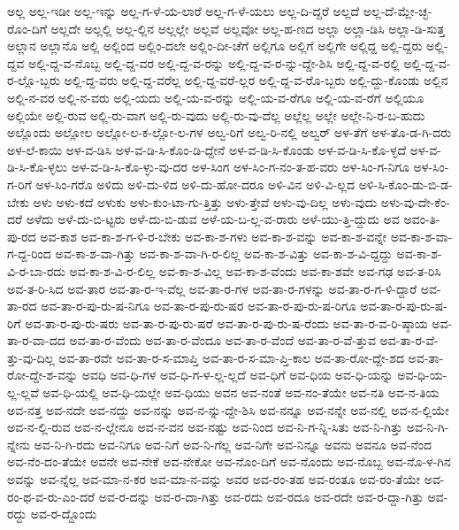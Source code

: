 {ಅಲ್ಲ
ಅಲ್ಲ-ಇಡೀ
ಅಲ್ಲ-ಇನ್ನು
ಅಲ್ಲ-ಗ-ಳೆ-ಯ-ಲಾರೆ
ಅಲ್ಲ-ಗ-ಳೆ-ಯಲು
ಅಲ್ಲ-ದಿ-ದ್ದರೆ
ಅಲ್ಲದೆ
ಅಲ್ಲ-ದೆ-ಮ್ಲೇ-ಚ್ಛ-ರೊಂ-ದಿಗೆ
ಅಲ್ಲದೇ
ಅಲ್ಲಲ್ಲಿ
ಅಲ್ಲ-ಲ್ಲಿನ
ಅಲ್ಲಲ್ಲೇ
ಅಲ್ಲವೆ
ಅಲ್ಲವೋ
ಅಲ್ಲ-ಹ-ಣದ
ಅಲ್ಲಾ
ಅಲ್ಲಾ-ಡಿಸಿ
ಅಲ್ಲಾ-ಡಿ-ಸುತ್ತ
ಅಲ್ಲಾನ
ಅಲ್ಲಾನೊ
ಅಲ್ಲಿ
ಅಲ್ಲಿಂದ
ಅಲ್ಲಿಂ-ದಲೇ
ಅಲ್ಲಿಂ-ದೀ-ಚೆಗೆ
ಅಲ್ಲಿಗೂ
ಅಲ್ಲಿಗೆ
ಅಲ್ಲಿಗೇ
ಅಲ್ಲಿದ್ದ
ಅಲ್ಲಿ-ದ್ದರು
ಅಲ್ಲಿ-ದ್ದವ
ಅಲ್ಲಿ-ದ್ದ-ವ-ನೊಬ್ಬ
ಅಲ್ಲಿ-ದ್ದ-ವರ
ಅಲ್ಲಿ-ದ್ದ-ವ-ರನ್ನು
ಅಲ್ಲಿ-ದ್ದ-ವ-ರ-ನ್ನು-ದ್ದೇ-ಶಿಸಿ
ಅಲ್ಲಿ-ದ್ದ-ವ-ರಲ್ಲಿ
ಅಲ್ಲಿ-ದ್ದ-ವ-ರ-ಲ್ಲೊ-ಬ್ಬರು
ಅಲ್ಲಿ-ದ್ದ-ವರು
ಅಲ್ಲಿ-ದ್ದ-ವರೆಲ್ಲ
ಅಲ್ಲಿ-ದ್ದ-ವರೆ-ಲ್ಲರ
ಅಲ್ಲಿ-ದ್ದ-ವ-ರೊ-ಬ್ಬರು
ಅಲ್ಲಿ-ದ್ದು-ಕೊಂಡು
ಅಲ್ಲಿನ
ಅಲ್ಲಿ-ನ-ವರ
ಅಲ್ಲಿ-ನ-ವರು
ಅಲ್ಲಿ-ಯದು
ಅಲ್ಲಿ-ಯ-ವ-ರನ್ನು
ಅಲ್ಲಿ-ಯ-ವ-ರೆಗೂ
ಅಲ್ಲಿ-ಯ-ವ-ರೆಗೆ
ಅಲ್ಲಿಯೂ
ಅಲ್ಲಿಯೇ
ಅಲ್ಲಿ-ರುವ
ಅಲ್ಲಿ-ರು-ವಾಗ
ಅಲ್ಲಿ-ರು-ವುದು
ಅಲ್ಲಿ-ರು-ವು-ದೆಲ್ಲ
ಅಲ್ಲೆಲ್ಲ
ಅಲ್ಲೇ
ಅಲ್ಲೇ-ನಿ-ರ-ಬ-ಹುದು
ಅಲ್ಲೊಂದು
ಅಲ್ಲೋಲ
ಅಲ್ಲೋ-ಲ-ಕ-ಲ್ಲೋ-ಲ-ಗಳ
ಅಲ್ವ-ರಿಗೆ
ಅಲ್ವ-ರಿ-ನಲ್ಲಿ
ಅಲ್ವರ್
ಅಳ-ತೆಗೆ
ಅಳ-ತೊ-ಡ-ಗಿ-ದರು
ಅಳ-ಲೆ-ಕಾಯಿ
ಅಳ-ವ-ಡಿಸಿ
ಅಳ-ವ-ಡಿ-ಸಿ-ಕೊಂ-ಡಿ-ದ್ದೇನೆ
ಅಳ-ವ-ಡಿ-ಸಿ-ಕೊಂಡು
ಅಳ-ವ-ಡಿ-ಸಿ-ಕೊ-ಳ್ಳದೆ
ಅಳ-ವ-ಡಿ-ಸಿ-ಕೊ-ಳ್ಳಲು
ಅಳ-ವ-ಡಿ-ಸಿ-ಕೊ-ಳ್ಳು-ವು-ದರ
ಅಳ-ಸಿಂಗ
ಅಳ-ಸಿಂ-ಗ-ನಂ-ತ-ಹ-ವರು
ಅಳ-ಸಿಂ-ಗ-ನಿಗೂ
ಅಳ-ಸಿಂ-ಗ-ರಿಗೆ
ಅಳ-ಸಿಂ-ಗರೊ
ಅಳಿದು
ಅಳಿ-ದು-ಳಿದ
ಅಳಿ-ದು-ಹೋ-ದರೂ
ಅಳಿ-ವಿನ
ಅಳಿ-ವಿ-ಲ್ಲದ
ಅಳಿ-ಸಿ-ಕೊಂ-ಡು-ಬಿ-ಡ-ಬೇಕು
ಅಳು
ಅಳು-ಕದೆ
ಅಳುಕು
ಅಳು-ಕುಂ-ಟಾ-ಗು-ತ್ತಿತ್ತು
ಅಳು-ತ್ತೇವೆ
ಅಳು-ವು-ದಿಲ್ಲ
ಅಳು-ವುದು
ಅಳು-ವು-ದೇ-ಕೆಂ-ದರೆ
ಅಳೆದು
ಅಳೆ-ದು-ಬಿ-ಟ್ಟರು
ಅಳೆ-ದು-ಬಿ-ಡುವ
ಅಳೆ-ಯ-ಬ-ಲ್ಲ-ವ-ರಾರು
ಅಳೆ-ಯು-ತ್ತಿ-ದ್ದುದು
ಅವ
ಅವಂ-ತಿ-ಪು-ರದ
ಅವ-ಕಾಶ
ಅವ-ಕಾ-ಶ-ಗ-ಳಿ-ರ-ಬೇಕು
ಅವ-ಕಾ-ಶ-ಗಳು
ಅವ-ಕಾ-ಶ-ವನ್ನು
ಅವ-ಕಾ-ಶ-ವನ್ನೇ
ಅವ-ಕಾ-ಶ-ವಾ-ಗ-ದ್ದ-ರಿಂದ
ಅವ-ಕಾ-ಶ-ವಾ-ಗಿತ್ತು
ಅವ-ಕಾ-ಶ-ವಾ-ಗಿ-ರ-ಲಿಲ್ಲ
ಅವ-ಕಾ-ಶ-ವಿತ್ತು
ಅವ-ಕಾ-ಶ-ವಿ-ದ್ದದ್ದು
ಅವ-ಕಾ-ಶ-ವಿ-ರ-ಬಾ-ರದು
ಅವ-ಕಾ-ಶ-ವಿ-ರ-ಲಿಲ್ಲ
ಅವ-ಕಾ-ಶ-ವಿಲ್ಲ
ಅವ-ಕಾ-ಶ-ವೆಂದು
ಅವ-ಕಾ-ಶವೇ
ಅವ-ಗಢ
ಅವ-ತ-ರಿಸಿ
ಅವ-ತ-ರಿ-ಸಿದ
ಅವ-ತಾರ
ಅವ-ತಾ-ರ-ಇ-ವೆಲ್ಲ
ಅವ-ತಾ-ರ-ಗಳ
ಅವ-ತಾ-ರ-ಗಳನ್ನು
ಅವ-ತಾ-ರ-ಗ-ಳಿ-ದ್ದಾರೆ
ಅವ-ತಾ-ರದ
ಅವ-ತಾ-ರ-ಪು-ರು-ಷ-ನಿಗೂ
ಅವ-ತಾ-ರ-ಪು-ರು-ಷರ
ಅವ-ತಾ-ರ-ಪು-ರು-ಷ-ರಿಗೂ
ಅವ-ತಾ-ರ-ಪು-ರು-ಷ-ರಿಗೆ
ಅವ-ತಾ-ರ-ಪು-ರು-ಷರು
ಅವ-ತಾ-ರ-ಪು-ರು-ಷರೆ
ಅವ-ತಾ-ರ-ಪು-ರು-ಷ-ರೆಂದು
ಅವ-ತಾ-ರ-ವ-ರಿ-ಷ್ಠಾಯ
ಅವ-ತಾ-ರ-ವಾ-ದದ
ಅವ-ತಾ-ರ-ವೆಂದು
ಅವ-ತಾ-ರ-ವೆಂದೂ
ಅವ-ತಾ-ರ-ವೆಂದೆ
ಅವ-ತಾ-ರ-ವೆ-ತ್ತುವ
ಅವ-ತಾ-ರ-ವೆ-ತ್ತು-ವು-ದಿಲ್ಲ
ಅವ-ತಾ-ರವೇ
ಅವ-ತಾ-ರ-ಸ-ಮಾಪ್ತಿ
ಅವ-ತಾ-ರ-ಸ-ಮಾ-ಪ್ತಿ-ಕಾಲ
ಅವ-ತಾ-ರೋ-ದ್ದೇ-ಶದ
ಅವ-ತಾ-ರೋ-ದ್ದೇ-ಶ-ವನ್ನು
ಅವಧಿ
ಅವ-ಧಿ-ಗಳ
ಅವ-ಧಿ-ಗ-ಳ-ಲ್ಲ-ಲ್ಲದೆ
ಅವ-ಧಿಗೆ
ಅವ-ಧಿಯ
ಅವ-ಧಿ-ಯನ್ನು
ಅವ-ಧಿ-ಯ-ಲ್ಲ-ಲ್ಲವೆ
ಅವ-ಧಿ-ಯಲ್ಲಿ
ಅವ-ಧಿ-ಯಲ್ಲೇ
ಅವ-ಧಿಯು
ಅವನ
ಅವ-ನಂತೆ
ಅವ-ನಂ-ತೆಯೇ
ಅವ-ನತಿ
ಅವ-ನ-ತಿಯ
ಅವ-ನತ್ತ
ಅವ-ನದೇ
ಅವ-ನದ್ದು
ಅವ-ನನ್ನು
ಅವ-ನ-ನ್ನು-ದ್ದೇ-ಶಿಸಿ
ಅವ-ನನ್ನೂ
ಅವ-ನನ್ನೇ
ಅವ-ನಲ್ಲಿ
ಅವ-ನ-ಲ್ಲಿಯೇ
ಅವ-ನ-ಲ್ಲಿ-ರುವ
ಅವ-ನ-ಲ್ಲೇನೂ
ಅವ-ನ-ವನ
ಅವ-ನಷ್ಟು
ಅವ-ನಿಂದ
ಅವ-ನಿ-ಗ-ನ್ನಿ-ಸಿತು
ಅವ-ನಿ-ಗಿತ್ತು
ಅವ-ನಿ-ಗಿ-ನ್ನೇನು
ಅವ-ನಿ-ಗಿ-ರದು
ಅವ-ನಿಗೂ
ಅವ-ನಿಗೆ
ಅವ-ನಿ-ಗೆಲ್ಲ
ಅವ-ನಿಗೇ
ಅವ-ನಿನ್ನೂ
ಅವನು
ಅವನೂ
ಅವ-ನೆಂದ
ಅವ-ನೆಂ-ದಂ-ತೆಯೇ
ಅವನೇ
ಅವ-ನೇಕೆ
ಅವ-ನೇಕೋ
ಅವ-ನೊಂ-ದಿಗೆ
ಅವ-ನೊಂದು
ಅವ-ನೊಬ್ಬ
ಅವ-ನೊ-ಳ-ಗಿನ
ಅವನ್ನು
ಅವ-ನ್ನೆಲ್ಲ
ಅವ-ಮಾ-ನ-ಕರ
ಅವ-ಮಾ-ನ-ವನ್ನು
ಅವರ
ಅವ-ರಂ-ತಹ
ಅವ-ರಂತೂ
ಅವ-ರಂ-ತೆಯೇ
ಅವ-ರಂ-ಥ-ವ-ರು-ಎಂ-ದರೆ
ಅವ-ರ-ದನ್ನು
ಅವ-ರ-ದಾ-ಗಿತ್ತು
ಅವ-ರದು
ಅವ-ರದೂ
ಅವ-ರದೇ
ಅವ-ರ-ದ್ದಾ-ಗಿತ್ತು
ಅವ-ರದ್ದು
ಅವ-ರ-ದ್ದೊಂದು
}
